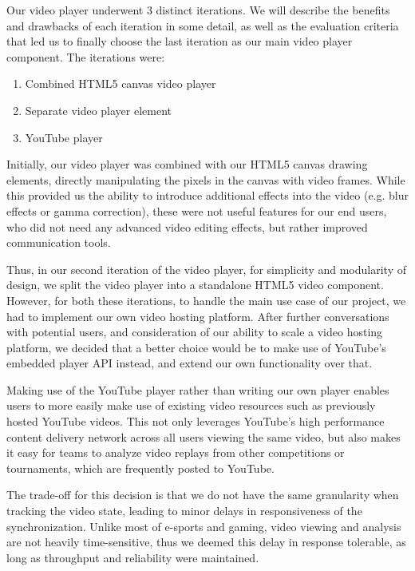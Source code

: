 \documentclass[conference]{IEEEtran}
\begin{document}
  Our video player underwent 3 distinct iterations. We will describe the benefits and drawbacks of each iteration in some detail, as well as the evaluation criteria that led us to finally choose the last iteration as our main video player component. The iterations were:

  \begin{enumerate}
      \item Combined HTML5 canvas video player
      \item Separate video player element
      \item YouTube player
  \end{enumerate}

  Initially, our video player was combined with our HTML5 canvas drawing elements, directly manipulating the pixels in the canvas with video frames. While this provided us the ability to introduce additional effects into the video (e.g. blur effects or gamma correction), these were not useful features for our end users, who did not need any advanced video editing effects, but rather improved communication tools.

  Thus, in our second iteration of the video player, for simplicity and modularity of design, we split the video player into a standalone HTML5 video component. However, for both these iterations, to handle the main use case of our project, we had to implement our own video hosting platform. After further conversations with potential users, and consideration of our ability to scale a video hosting platform, we decided that a better choice would be to make use of YouTube's embedded player API instead, and extend our own functionality over that.

  Making use of the YouTube player rather than writing our own player enables users to more easily make use of existing video resources such as previously hosted YouTube videos. This not only leverages YouTube's high performance content delivery network across all users viewing the same video, but also makes it easy for teams to analyze video replays from other competitions or tournaments, which are frequently posted to YouTube.

  The trade-off for this decision is that we do not have the same granularity when tracking the video state, leading to minor delays in responsiveness of the synchronization. Unlike most of e-sports and gaming, video viewing and analysis are not heavily time-sensitive, thus we deemed this delay in response tolerable, as long as throughput and reliability were maintained.
\end{document}
